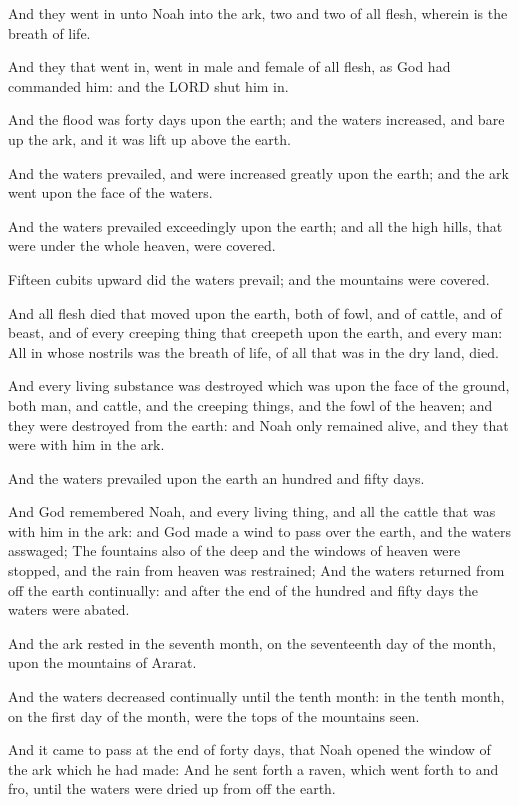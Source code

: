 \Verse And they went in unto Noah into the ark, two and two of all flesh, wherein is the breath of life.

\Verse And they that went in, went in male and female of all flesh, as God had commanded him: and the LORD shut him in.

\Verse And the flood was forty days upon the earth; and the waters increased, and bare up the ark, and it was lift up above the earth.

\Verse And the waters prevailed, and were increased greatly upon the earth; and the ark went upon the face of the waters.

\Verse And the waters prevailed exceedingly upon the earth; and all the high hills, that were under the whole heaven, were covered.

\Verse Fifteen cubits upward did the waters prevail; and the mountains were covered.

\Verse And all flesh died that moved upon the earth, both of fowl, and of cattle, and of beast, and of every creeping thing that creepeth upon the earth, and every man: \Verse All in whose nostrils was the breath of life, of all that was in the dry land, died.

\Verse And every living substance was destroyed which was upon the face of the ground, both man, and cattle, and the creeping things, and the fowl of the heaven; and they were destroyed from the earth: and Noah only remained alive, and they that were with him in the ark.

\Verse And the waters prevailed upon the earth an hundred and fifty days.

\Chapter
\Verse And God remembered Noah, and every living thing, and all the cattle that was with him in the ark: and God made a wind to pass over the earth, and the waters asswaged; \Verse The fountains also of the deep and the windows of heaven were stopped, and the rain from heaven was restrained; \Verse And the waters returned from off the earth continually: and after the end of the hundred and fifty days the waters were abated.

\Verse And the ark rested in the seventh month, on the seventeenth day of the month, upon the mountains of Ararat.

\Verse And the waters decreased continually until the tenth month: in the tenth month, on the first day of the month, were the tops of the mountains seen.

\Verse And it came to pass at the end of forty days, that Noah opened the window of the ark which he had made: \Verse And he sent forth a raven, which went forth to and fro, until the waters were dried up from off the earth.


